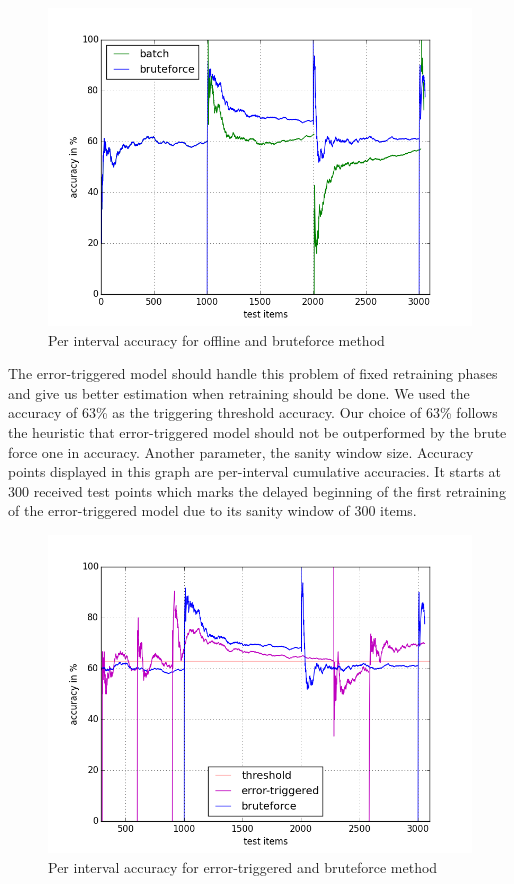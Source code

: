 \documentclass{article} %
\begin{document}
\begin{figure}[htbp]
  \centering
  \includegraphics[scale=0.5]{./plots/bruteforce_batch.png}
  \caption{Per interval accuracy for offline and bruteforce method}
\end{figure}

The error-triggered model should handle this problem of fixed retraining phases and give us better estimation when retraining should be done. We used the accuracy of 63\% as the triggering threshold accuracy. Our choice of 63\% follows the heuristic that error-triggered model should not be outperformed by the brute force one in accuracy. Another parameter, the sanity window size. Accuracy points displayed in this graph are per-interval cumulative accuracies. It starts at 300 received test points which marks the delayed beginning of the first retraining of the error-triggered model due to its sanity window of 300 items.
 

\begin{figure}[htbp]
  \centering
  \includegraphics[scale=0.5]{./plots/errortriggered_bruteforce.png}
  \caption{Per interval accuracy for error-triggered and bruteforce method}
\end{figure}
\end{document}
